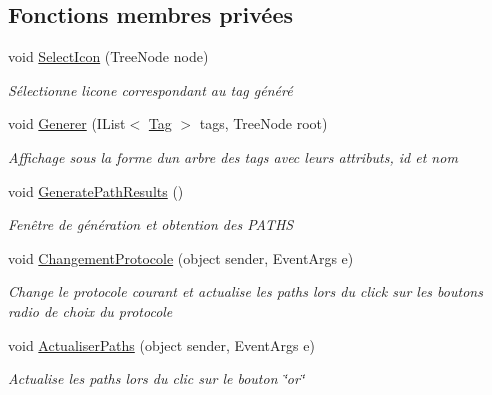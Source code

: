 \subsection*{Fonctions membres privées}
\begin{DoxyCompactItemize}
\item 
void \mbox{\hyperlink{class_m_t_connect_agent_1_1_user_control_display_tab_aea40e1e7daf5f6821fc4b6c7dc717563}{Select\+Icon}} (Tree\+Node node)
\begin{DoxyCompactList}\small\item\em Sélectionne l\textquotesingle{}icone correspondant au tag généré \end{DoxyCompactList}\item 
void \mbox{\hyperlink{class_m_t_connect_agent_1_1_user_control_display_tab_a936a17ca9a88c0cbab0e70894567cdad}{Generer}} (I\+List$<$ \mbox{\hyperlink{class_m_t_connect_agent_1_1_model_1_1_tag}{Tag}} $>$ tags, Tree\+Node root)
\begin{DoxyCompactList}\small\item\em Affichage sous la forme d\textquotesingle{}un arbre des tags avec leurs attributs, id et nom \end{DoxyCompactList}\item 
void \mbox{\hyperlink{class_m_t_connect_agent_1_1_user_control_display_tab_a8007de48e5b3c138c3260fa361f744c0}{Generate\+Path\+Results}} ()
\begin{DoxyCompactList}\small\item\em Fenêtre de génération et obtention des P\+A\+T\+HS \end{DoxyCompactList}\item 
void \mbox{\hyperlink{class_m_t_connect_agent_1_1_user_control_display_tab_ae279107d6601b7bc7b28a44dcbc68e5e}{Changement\+Protocole}} (object sender, Event\+Args e)
\begin{DoxyCompactList}\small\item\em Change le protocole courant et actualise les paths lors du click sur les boutons radio de choix du protocole \end{DoxyCompactList}\item 
void \mbox{\hyperlink{class_m_t_connect_agent_1_1_user_control_display_tab_a2f29e407545f62944defd9533dc895e0}{Actualiser\+Paths}} (object sender, Event\+Args e)
\begin{DoxyCompactList}\small\item\em Actualise les paths lors du clic sur le bouton \char`\"{}or\char`\"{} \end{DoxyCompactList}\item 

\end{DoxyCompactItemize}
